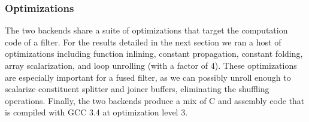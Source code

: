 \subsubsection{Optimizations}

The two backends share a suite of optimizations that target the
computation code of a filter.  For the results detailed in the next
section we ran a host of optimizations including function inlining,
constant propagation, constant folding, array scalarization, and loop
unrolling (with a factor of 4).  These optimizations are especially
important for a fused filter, as we can possibly unroll enough to
scalarize constituent splitter and joiner buffers, eliminating the
shuffling operations.  Finally, the two backends produce a mix of C
and assembly code that is compiled with GCC 3.4 at optimization level
3.
